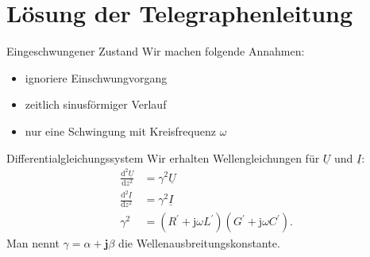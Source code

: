 \documentclass{beamer}
\begin{document}
\section{Lösung der Telegraphenleitung}


\begin{frame}{Eingeschwungener Zustand}
Wir machen folgende Annahmen:
\begin{itemize}
    \item<1-> ignoriere Einschwungvorgang
    \item<2-> zeitlich sinusförmiger Verlauf
    \item<3-> nur eine Schwingung mit Kreisfrequenz $\omega$
\end{itemize}

\vspace*{1em}

\end{frame}


\begin{frame}{Differentialgleichungssystem}
Wir erhalten Wellengleichungen für $\underline{U}$ und $\underline{I}$:
\begin{align}
    \frac{\text{d}^{2} \underline{U}}{\text{d} z^{2}} &= \gamma^{2} \underline{U} \label{eq:VerlustDgl1} \\[1ex]
    \frac{\text{d}^{2} \underline{I}}{\text{d} z^{2}} &= \gamma^{2} \underline{I} \label{eq:VerlustDgl2} \\[1ex]
    \gamma^{2} &= \left( R^{\prime} + \mathrm{j} \omega L^{\prime} \right) \left( G^{\prime} + \mathrm{j} \omega
    C^{\prime} \right) \label{eq:Gamma}.
\end{align}
Man nennt $\gamma = \alpha + \mathbf{j} \beta$ die Wellenausbreitungskonstante.

\end{frame}
\end{document}
